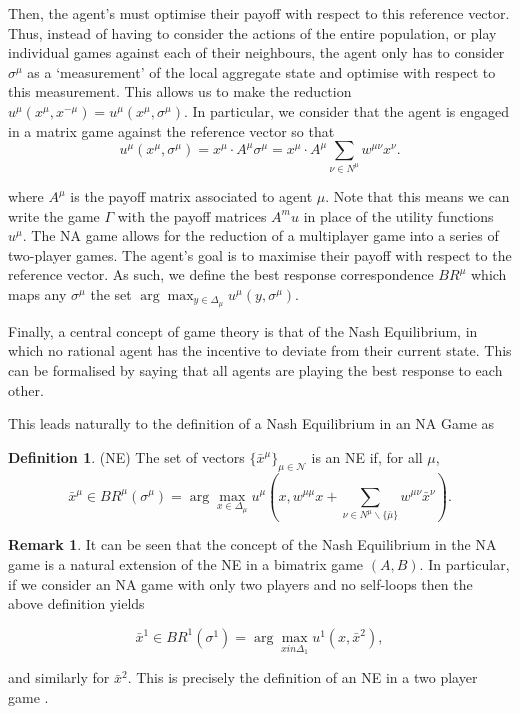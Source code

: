 \documentclass{article}
\theoremstyle{definition}
\newtheorem*{definition}{Definition}
\newtheorem*{remark}{Remark}
\newcommand{\agentset}{\mathcal{N}}
\newcommand{\utility}[1]{u^{#1}}
\newcommand{\wmunu}{w^{\mu \nu}}
\newcommand{\xmu}{x^{\mu}}
\newcommand{\xnu}{x^{\nu}}
\newcommand{\refmu}{\sigma^{\mu}}
\newcommand{\NE}[1]{\bar{x}^{#1}}
\newcommand{\weightedsum}{ \sum_{\nu \in N^\mu} \wmunu \xnu}
\newcommand{\xnotmu}{x^{-\mu}}
\begin{document}
	Then, the agent's must optimise their payoff with respect to this reference vector. Thus,
	instead of having to consider the actions of the entire population, or play individual games
	against each of their neighbours, the agent only has to consider $\sigma^\mu$ as a
	`measurement' of the local aggregate state and optimise with respect to this measurement.
	This allows us to make the reduction $u^\mu(\xmu, \xnotmu) = u^\mu(\xmu, \refmu)$. In
	particular, we consider that the agent is engaged in a matrix game against the
	reference vector so that
%
	\begin{equation}
		u^\mu(\xmu, \refmu) = \xmu \cdot A^\mu \refmu = \xmu
                \cdot A^\mu \weightedsum.
	\end{equation}

	where $A^\mu$ is the payoff matrix associated to agent $\mu$. Note that this means we can write
	the game $\Gamma$ with the payoff matrices $A^mu$ in place of the utility functions
	$\utility{\mu}$. The NA game allows for the reduction of a multiplayer game into a series of
	two-player games. The agent's goal is to maximise their payoff with respect to the reference
	vector. As such, we define the best response correspondence $BR^\mu$ which maps any $\refmu$
	the set $\arg \max_{y \in \Delta_\mu} {u^\mu(y, \refmu)}$. 
	
	Finally, a central concept of game theory is that of the Nash Equilibrium, in which no rational
	agent has the incentive to deviate from their current state. This can be formalised by saying
	that all agents are playing the best response to each other.
	
	This leads naturally to the definition of a Nash Equilibrium in an NA Game as

	\begin{definition}(NE)
		The set of vectors $\{ \NE{\mu}\}_{\mu \in \agentset}$ is an NE if, for all $\mu$,	
		\begin{equation*}
		\NE{\mu} \in BR^\mu (\refmu) = \arg \max_{x \in \Delta_\mu} u^\mu(x, w^{\mu \mu} x + \sum_{\nu \in N^\mu \backslash \{\bar{\mu}\}} \wmunu \NE{\nu}).
		\end{equation*}	
	\end{definition}
    
	\begin{remark}
		It can be seen that the concept of the Nash Equilibrium in the NA game is a natural
		extension of the NE in a bimatrix game $(A, B)$. In particular, if we consider an NA game
		with only two players and no self-loops then the above definition yields

		\begin{equation*}
			\NE{1} \in BR^1 (\sigma^1) = \arg \max_{x in \Delta_1} u^1 (x, \NE{2}), 
		\end{equation*}

		and similarly for $\NE{2}$. This is precisely the definition of an NE in a two player game \cite{}.
	\end{remark}
\end{document}
